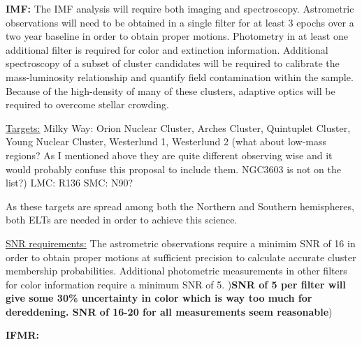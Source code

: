 \documentclass[11pt]{article}
\begin{document}
\noindent
{\bf IMF:} 
The IMF analysis will require both imaging and spectroscopy. Astrometric observations will need to be obtained in a single filter for at least 3 epochs over a two year baseline in order to obtain proper motions. Photometry in at least one additional filter is required for color and extinction information. Additional spectroscopy of a subset of cluster candidates will be required to calibrate the mass-luminosity relationship and quantify field contamination within the sample. Because of the high-density of many of these clusters, adaptive optics will be required to overcome stellar crowding.

\underline{Targets:} 
Milky Way: Orion Nuclear Cluster, Arches Cluster, Quintuplet Cluster, Young Nuclear Cluster, Westerlund 1, Westerlund 2 (what about low-mass regions? As I mentioned above they are quite different observing wise and it would probably confuse this proposal to include them. NGC3603 is not on the list?)
LMC: R136 
SMC: N90? 

As these targets are spread among both the Northern and Southern hemispheres, both ELTs are needed in order to achieve this science. 

\underline{SNR requirements:}
The astrometric observations require a minimim SNR of 16 in order to obtain proper motions at sufficient precision to calculate accurate cluster membership probabilities. Additional photometric measurements in other filters for color information require a minimum SNR of 5. 
){\bf SNR of 5 per filter will give some 30\% uncertainty in color which is way too much for dereddening. SNR of 16-20 for all measurements seem reasonable})

{\bf IFMR:}



%
\end{document}
